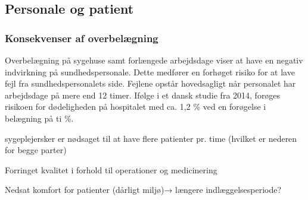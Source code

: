 \subsection{Personale og patient}

\subsubsection{Konsekvenser af overbelægning}

Overbelægning på sygehuse samt forlængede arbejdsdage viser at have en negativ indvirkning på sundhedspersonale. Dette medfører en forhøget risiko for at lave fejl fra sundhedspersonalets side. Fejlene opstår hovedsagligt når personalet har arbejdsdage på mere end 12 timer. Ifølge i et dansk studie fra 2014, forøges risikoen for dødeligheden på hospitalet med ca. 1,2 \% ved en forøgelse i belægning på ti \%.







sygeplejersker er nødsaget til at have flere patienter pr. time (hvilket er nederen for begge parter)

Forringet kvalitet i forhold til operationer og medicinering 

Nedsat komfort for patienter (dårligt miljø)→ længere indlæggelsesperiode?

